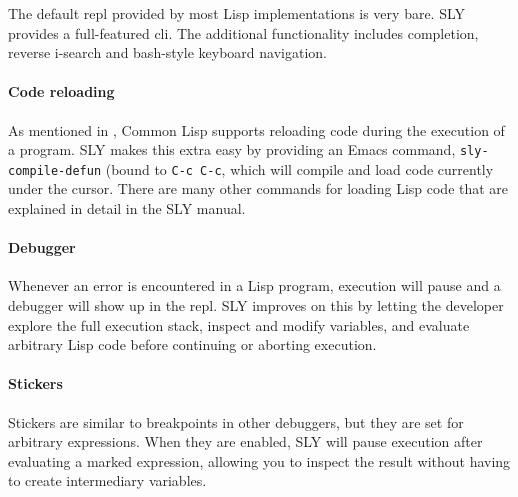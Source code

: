 The default \ac{repl} provided by most Lisp implementations is very bare.
SLY provides a full-featured \ac{cli}.
The additional functionality includes completion,
reverse i-search and bash-style keyboard navigation.

\paragraph{Code reloading}

As mentioned in ,
Common Lisp supports reloading code during the execution of a program.
SLY makes this extra easy by providing an Emacs command,
\texttt{sly-compile-defun} (bound to \texttt{C-c C-c},
which will compile and load code currently under the cursor.
There are many other commands for loading Lisp code that are explained in detail in the SLY manual\cite{sly_manual}.

\paragraph{Debugger}

Whenever an error is encountered in a Lisp program,
execution will pause and a debugger will show up in the \ac{repl}.
SLY improves on this by letting the developer explore the full execution stack,
inspect and modify variables,
and evaluate arbitrary Lisp code before continuing or aborting execution.

\paragraph{Stickers}

Stickers are similar to breakpoints in other debuggers,
but they are set for arbitrary expressions.
When they are enabled,
SLY will pause execution after evaluating a marked expression,
allowing you to inspect the result without having to create intermediary variables.
